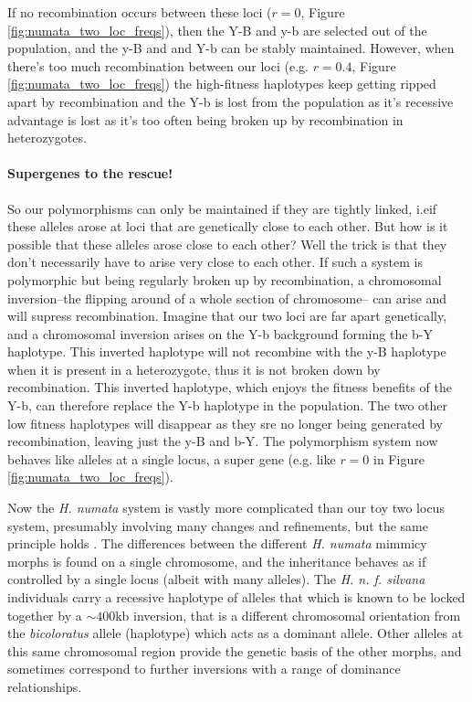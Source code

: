 If no recombination occurs between these loci ($r=0$, Figure \ref{fig:numata_two_loc_freqs}), then the Y-B and y-b are selected out of the population, and the y-B and and  Y-b can be stably maintained. However, when there's too much recombination between our loci (e.g. $r=0.4$, Figure \ref{fig:numata_two_loc_freqs}) the high-fitness haplotypes keep getting ripped apart by recombination and the Y-b is lost from the population as it's recessive advantage is lost as it's too often being broken up by recombination in heterozygotes.

\paragraph{Supergenes to the rescue!}

So our polymorphisms can only be maintained if they are tightly linked, i.eif these alleles arose at loci that are genetically close to each other. But how is it possible that these alleles arose close to each other? Well the trick is that they don't necessarily have to arise very close to each other. If such a system is polymorphic but being regularly broken up by recombination, a chromosomal inversion--the flipping around of a whole section of chromosome-- can arise and will supress recombination. Imagine that our two loci are far apart genetically, and a chromosomal inversion arises on the Y-b  background forming the b-Y haplotype. This inverted haplotype will not recombine with the y-B haplotype when it is present in a heterozygote, thus it is not broken down by recombination. This inverted haplotype, which enjoys the fitness benefits of the Y-b, can therefore replace the Y-b haplotype in the population. The two other low fitness haplotypes will disappear as they sre no longer being generated by recombination, leaving just the y-B and b-Y. 
  The polymorphism system now behaves like alleles at a single locus, a super gene  (e.g. like $r=0$ in Figure \ref{fig:numata_two_loc_freqs}).

  Now the {\it H. numata} system is vastly more complicated than our toy two locus system, presumably involving many changes and refinements, but the same principle holds \citep{joron2011chromosomal}. The differences between the different {\it H. numata} mimmicy morphs is found on a single chromosome, and the inheritance behaves as if controlled by a single locus (albeit with many alleles).  The {\it H. n. f. silvana} individuals carry a recessive haplotype of alleles that which is known to be locked together by a $\sim 400$kb inversion, that is a different chromosomal orientation from the {\it bicoloratus} allele (haplotype) which acts as a dominant allele. Other alleles at this same chromosomal region provide the genetic basis of the other morphs, and sometimes correspond to further inversions with a range of dominance relationships. 





